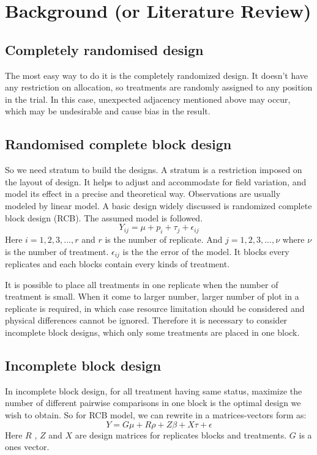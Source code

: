 \documentclass[
  12pt,
]{amsart}
\begin{document}
\section{Background (or Literature
Review)}\label{background-or-literature-review}

\subsection{Completely randomised
design}\label{completely-randomised-design}

The most easy way to do it is the completely randomized design. It
doesn't have any restriction on allocation, so treatments are randomly
assigned to any position in the trial. In this case, unexpected
adjacency mentioned above may occur, which may be undesirable and cause
bias in the result.

\subsection{Randomised complete block
design}\label{randomised-complete-block-design}

So we need stratum to build the designs. A stratum is a restriction
imposed on the layout of design. It helps to adjust and accommodate for
field variation, and model its effect in a precise and theoretical way.
Observations are usually modeled by linear model. A basic design widely
discussed is randomized complete block design (RCB). The assumed model
is followed. \[Y_{ij} = \mu + p_i + \tau_j + \epsilon_{ij}\] Here
\(i=1,2,3,...,r\) and \(r\) is the number of replicate. And
\(j=1,2,3,...,\nu\) where \(\nu\) is the number of treatment.
\(\epsilon_{ij}\) is the the error of the model. It blocks every
replicates and each blocks contain every kinds of treatment.

It is possible to place all treatments in one replicate when the number
of treatment is small. When it come to larger number, larger number of
plot in a replicate is required, in which case resource limitation
should be considered and physical differences cannot be ignored.
Therefore it is necessary to consider incomplete block designs, which
only some treatments are placed in one block.

\subsection{Incomplete block design}\label{incomplete-block-design}

In incomplete block design, for all treatment having same status,
maximize the number of different pairwise comparisons in one block is
the optimal design we wish to obtain. So for RCB model, we can rewrite
in a matrices-vectors form as: \[Y=G\mu +R\rho+Z\beta+X\tau+\epsilon\]
Here \(R\) , \(Z\) and \(X\) are design matrices for replicates blocks
and treatments. \(G\) is a ones vector.
\end{document}
